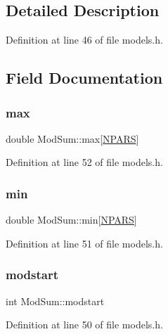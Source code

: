 \subsection{Detailed Description}


Definition at line 46 of file models.\+h.



\subsection{Field Documentation}
\mbox{\label{struct_mod_sum_ad2afe982f87b1ca3aa688dde9c015ec2}} 
\subsubsection{\texorpdfstring{max}{max}}
{\footnotesize\ttfamily double Mod\+Sum\+::max\mbox{[}\hyperlink{models_8h_a4a80e098a43386a893ebc656b14e636c}{N\+P\+A\+RS}\mbox{]}}



Definition at line 52 of file models.\+h.

\mbox{\label{struct_mod_sum_a37362f221d9d907352d0316899cd166a}} 
\subsubsection{\texorpdfstring{min}{min}}
{\footnotesize\ttfamily double Mod\+Sum\+::min\mbox{[}\hyperlink{models_8h_a4a80e098a43386a893ebc656b14e636c}{N\+P\+A\+RS}\mbox{]}}



Definition at line 51 of file models.\+h.

\mbox{\label{struct_mod_sum_a41fef05c528b70fa8216c4ac3c8c8238}} 
\subsubsection{\texorpdfstring{modstart}{modstart}}
{\footnotesize\ttfamily int Mod\+Sum\+::modstart}



Definition at line 50 of file models.\+h.

